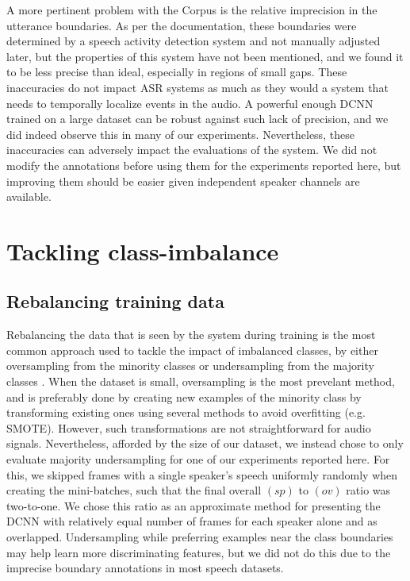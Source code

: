 \documentclass[a4paper]{article}
\begin{document}
A more pertinent problem with the Corpus is the relative imprecision in the utterance boundaries.
As per the documentation,
these boundaries were determined by a speech activity detection system and not manually adjusted later,
but the properties of this system have not been mentioned,
and we found it to be less precise than ideal, especially in regions of small gaps.
These inaccuracies do not impact ASR systems as much as they would a system that needs to temporally localize events in the audio.
A powerful enough DCNN trained on a large dataset can be robust against such lack of precision,
and we did indeed observe this in many of our experiments.
Nevertheless, these inaccuracies can adversely impact the evaluations of the system.
We did not modify the annotations before using them for the experiments reported here,
but improving them should be easier given independent speaker channels are available.

\section{Tackling class-imbalance} \label{sec:imbalance}
\subsection{Rebalancing training data}
Rebalancing the data that is seen by the system during training is the most common approach used to tackle the impact of imbalanced classes,
by either oversampling from the minority classes or undersampling from the majority classes
\cite{wang_training_2016,Budasystematicstudyclass2017}.
When the dataset is small, oversampling is the most prevelant method,
and is preferably done by creating new examples of the minority class by transforming existing ones using several methods to avoid overfitting (e.g. SMOTE).
However, such transformations are not straightforward for audio signals.
Nevertheless, afforded by the size of our dataset,
we instead chose to only evaluate majority undersampling for one of our experiments reported here.
For this, we skipped frames with a single speaker's speech uniformly randomly when creating the mini-batches,
such that the final overall $(sp)$ to $(ov)$ ratio was two-to-one.
We chose this ratio as an approximate method for presenting the DCNN with relatively equal number of frames for each speaker alone and as overlapped.
Undersampling while preferring examples near the class boundaries may help learn more discriminating features,
but we did not do this due to the imprecise boundary annotations in most speech datasets.
\end{document}
